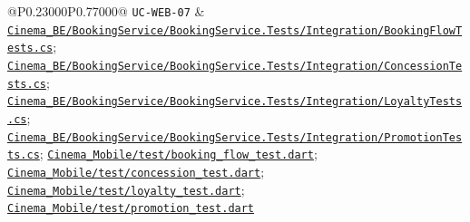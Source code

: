 \begin{longtable}{@{}P{0.23000\SRSWidth}P{0.77000\SRSWidth}@{}}
\texttt{UC-\allowbreak{}WEB-\allowbreak{}07} & \href{../../../Cinema\_BE/BookingService/BookingService.Tests/Integration/BookingFlowTests.cs}{\texttt{Cinema\_\allowbreak{}BE/\allowbreak{}Booking\allowbreak{}Service/\allowbreak{}Booking\allowbreak{}Service.\allowbreak{}Tests/\allowbreak{}Integrat\allowbreak{}ion/\allowbreak{}Booking\allowbreak{}Flow\allowbreak{}Tests.\allowbreak{}cs}}; \href{../../../Cinema\_BE/BookingService/BookingService.Tests/Integration/ConcessionTests.cs}{\texttt{Cinema\_\allowbreak{}BE/\allowbreak{}Booking\allowbreak{}Service/\allowbreak{}Booking\allowbreak{}Service.\allowbreak{}Tests/\allowbreak{}Integrat\allowbreak{}ion/\allowbreak{}Concessi\allowbreak{}on\allowbreak{}Tests.\allowbreak{}cs}}; \href{../../../Cinema\_BE/BookingService/BookingService.Tests/Integration/LoyaltyTests.cs}{\texttt{Cinema\_\allowbreak{}BE/\allowbreak{}Booking\allowbreak{}Service/\allowbreak{}Booking\allowbreak{}Service.\allowbreak{}Tests/\allowbreak{}Integrat\allowbreak{}ion/\allowbreak{}Loyalty\allowbreak{}Tests.\allowbreak{}cs}}; \href{../../../Cinema\_BE/BookingService/BookingService.Tests/Integration/PromotionTests.cs}{\texttt{Cinema\_\allowbreak{}BE/\allowbreak{}Booking\allowbreak{}Service/\allowbreak{}Booking\allowbreak{}Service.\allowbreak{}Tests/\allowbreak{}Integrat\allowbreak{}ion/\allowbreak{}Promotio\allowbreak{}n\allowbreak{}Tests.\allowbreak{}cs}}; \href{../../../Cinema\_Mobile/test/booking\_flow\_test.dart}{\texttt{Cinema\_\allowbreak{}Mobile/\allowbreak{}test/\allowbreak{}booking\_\allowbreak{}flow\_\allowbreak{}test.\allowbreak{}dart}}; \href{../../../Cinema\_Mobile/test/concession\_test.dart}{\texttt{Cinema\_\allowbreak{}Mobile/\allowbreak{}test/\allowbreak{}concessi\allowbreak{}on\_\allowbreak{}test.\allowbreak{}dart}}; \href{../../../Cinema\_Mobile/test/loyalty\_test.dart}{\texttt{Cinema\_\allowbreak{}Mobile/\allowbreak{}test/\allowbreak{}loyalty\_\allowbreak{}test.\allowbreak{}dart}}; \href{../../../Cinema\_Mobile/test/promotion\_test.dart}{\texttt{Cinema\_\allowbreak{}Mobile/\allowbreak{}test/\allowbreak{}promotio\allowbreak{}n\_\allowbreak{}test.\allowbreak{}dart}} \\[3pt]

\end{longtable}
